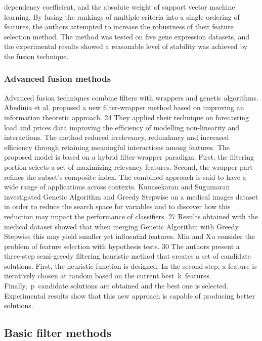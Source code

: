 \documentclass[review]{elsarticle}
\begin{document}
dependency coefficient, and the absolute weight of support vector machine learning. By fusing the rankings of multiple criteria into a single ordering of features, the authors attempted to increase the robustness of their feature selection method. The method was tested on five gene expression datasets, and the experimental results showed a reasonable level of stability was achieved by the fusion technique.  

\subsubsection{Advanced fusion methods}

Advanced fusion techniques combine filters with wrappers and genetic algorithms. Abedinia et al. proposed a new filter-wrapper method based on improving an information theoretic approach.\cite{Abedinia2017} 24  They applied their technique on forecasting load and prices data improving the efficiency of modelling non-linearity and interactions. The method reduced irrelevancy, redundancy and increased efficiency through retaining meaningful interactions among features. The proposed model is based on a hybrid filter-wrapper paradigm. First, the filtering portion selects a set of maximizing relevancy features. Second, the wrapper part refines the subset's composite index. The combined approach is said to have a wide range of applications across contexts. Kunasekaran and Sugumaran  investigated Genetic Algorithm and Greedy Stepwise on a medical images dataset in order to reduce the search space for variables and to discover how this reduction may impact the performance of classifiers.\cite{Kunasekaran2016} 27  Results obtained with the medical dataset showed that when merging Genetic Algorithm with Greedy Stepwise this may yield smaller yet influential features. Min and Xu consider the problem of feature selection with hypothesis tests.\cite{Min2016} 30  The authors present a three-step semi-greedy filtering heuristic method that creates a set of candidate solutions. First, the heuristic function is designed. In the second step, a feature is iteratively chosen at random based on the current best k features. Finally, p candidate solutions are obtained and the best one is selected. Experimental results show that this new approach is capable of producing better solutions.

\subsection{Basic filter methods}
\end{document}
